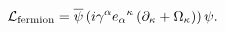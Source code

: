 \begin{equation}
{\cal L}_{{\rm fermion}} = {\overline \psi} \left( i \gamma^\alpha 
{e_\alpha}^\kappa \left(
\partial_\kappa + \Omega_\kappa \right) 
\right) \psi.
\end{equation}

